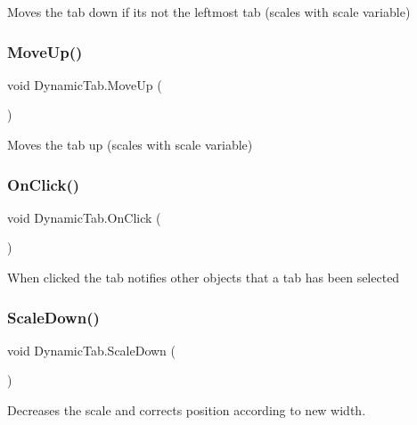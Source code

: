 Moves the tab down if it\textquotesingle{}s not the leftmost tab (scales with scale variable) 

\mbox{\label{class_dynamic_tab_a6aadee2864c08657e3e87eac95f6174a}} 
\subsubsection{\texorpdfstring{Move\+Up()}{MoveUp()}}
{\footnotesize\ttfamily void Dynamic\+Tab.\+Move\+Up (\begin{DoxyParamCaption}{ }\end{DoxyParamCaption})}



Moves the tab up (scales with scale variable) 

\mbox{\label{class_dynamic_tab_a17b150a9b2c6d126ae719a1f20da9272}} 
\subsubsection{\texorpdfstring{On\+Click()}{OnClick()}}
{\footnotesize\ttfamily void Dynamic\+Tab.\+On\+Click (\begin{DoxyParamCaption}{ }\end{DoxyParamCaption})}



When clicked the tab notifies other objects that a tab has been selected 

\mbox{\label{class_dynamic_tab_acedc824d9b337ce9877170c90974ae89}} 
\subsubsection{\texorpdfstring{Scale\+Down()}{ScaleDown()}}
{\footnotesize\ttfamily void Dynamic\+Tab.\+Scale\+Down (\begin{DoxyParamCaption}{ }\end{DoxyParamCaption})}



Decreases the scale and corrects position according to new width. 

